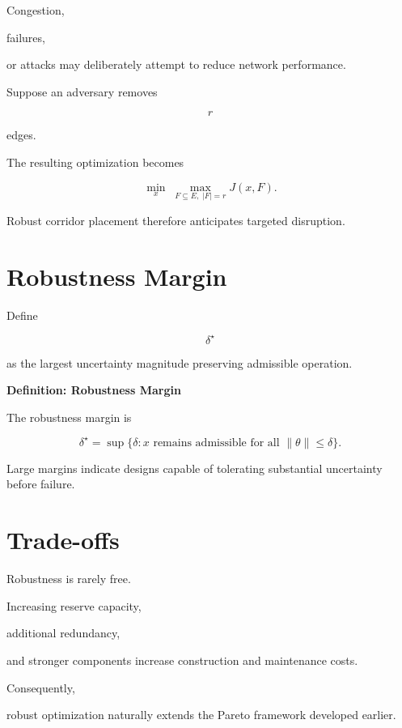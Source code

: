 \documentclass[11pt,fleqn]{book}
\numberwithin{equation}{chapter}
\newenvironment{definition}[1]
  {\begin{definitionEnv}
   \noindent\textbf{Definition: #1}\par\smallskip}
  {\end{definitionEnv}}
\theoremstyle{plain}
\theoremstyle{definition}
\theoremstyle{remark}
\begin{document}
Congestion,

failures,

or attacks may deliberately attempt to reduce network performance.

Suppose an adversary removes

\[
r
\]

edges.

The resulting optimization becomes

\[
\min_x
\;
\max_{F\subseteq E,\;|F|=r}
J(x,F).
\]

Robust corridor placement therefore anticipates targeted disruption.


\section{Robustness Margin}

Define

\[
\delta^\star
\]

as the largest uncertainty magnitude preserving admissible operation.


\begin{definition}{Robustness Margin}

The robustness margin is

\[
\boxed{
\delta^\star
=
\sup
\{
\delta:
x
\text{ remains admissible for all }
\|\theta\|\le\delta
\}.
}
\]

\end{definition}

Large margins indicate designs capable of tolerating substantial
uncertainty before failure.


\section{Trade-offs}

Robustness is rarely free.

Increasing reserve capacity,

additional redundancy,

and stronger components increase construction and maintenance costs.

Consequently,

robust optimization naturally extends the Pareto framework developed
earlier.
\end{document}
